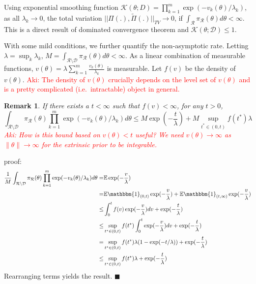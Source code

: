 \documentclass[10pt]{article}
\newcommand{\leo}[1]{{\color{blue}{Leo: #1}}}
\newcommand{\aki}[1]{\textcolor{red}{Aki: #1}}
\newtheorem{remark}{Remark}
\newcommand{\mc}[1]{\mathcal{#1}}
\DeclareMathOperator{\1}{\mathbbm{1}}
\begin{document}
Using exponential smoothing function $\mc K(\theta; D) = \prod_{k=1}^m \exp( -v_k(\theta)/\lambda_k)$, as all $\lambda_k \rightarrow 0$, the total variation $||\Pi(.), \tilde{\Pi}(.) ||_{TV} \rightarrow 0$, if $\int_{\mc R} \pi_{\mc R}(\theta) d\theta<\infty$. This is a direct result of dominated convergence theorem and $\mc K(\theta; \mc D)\le 1$.


With some mild conditions, we further quantify the non-asymptotic rate. Letting $\lambda = \sup_k \lambda_k$, $M= \int_{\mc R \setminus \mc D} \pi_{\mc R}(\theta) d\theta<\infty$. As a linear combination of measurable functions, $v(\theta)=\lambda\sum_{k=1}^m\frac{ v_k(\theta)}{\lambda_k}$ is measurable. Let $f(v)$ be the density of $v(\theta)$. \aki{The density of $v(\theta)$ crucially depends on the level set of $v(\theta)$ and is a pretty complicated (i.e.\ intractable) object in general.}

\begin{remark}
\label{convergence_rate}
If there exists a $t<\infty$ such that $f(v) < \infty$, for any $t>0$,
$$\int_{\mc R \setminus \mc D} {\pi_{\mc R}(\theta)} \prod_{k=1}^m \exp( -v_k(\theta)/\lambda_k) d \theta \le 
 {M} \exp(-\frac{t}{\lambda}) + {M} \sup_{t^*\in(0,t)} {f(t^*)}\lambda 
$$
\aki{How is this bound based on $v(\theta) < t$ useful? We need $v(\theta) \to \infty$ as $\| \theta \| \to \infty$ for the extrinsic prior to be integrable. }\leo{I rephrased the statement}
\end{remark}
proof:
\begin{equation}
\begin{aligned}
\frac{1}{M}\int_{\mc R \setminus \mc D} {\pi_{\mc R}(\theta)} \prod_{k=1}^m \exp( -v_k(\theta)/\lambda_k) d \theta = & 
\mathbb{E} \exp(- \frac{v}{\lambda}) \\
= & \mathbb{E} \mathbbm{1}_{(0,t)} \exp(- \frac{v}{\lambda}) +  \mathbb{E} \mathbbm{1}_{(t,\infty)} \exp(- \frac{v}{\lambda}) \\
\le & \int_0^t f(v) \exp(- \frac{v}{\lambda}) dv + \exp(-\frac{t}{\lambda}) \\
\le & \sup_{t^*\in(0,t)} f(t^*) \int_0^t \exp(- \frac{v}{\lambda}) dv + \exp(-\frac{t}{\lambda}) \\
= & \sup_{t^*\in(0,t)} f(t^*)  \lambda (1- \exp(-t/\lambda)) + \exp(-\frac{t}{\lambda}) \\
\le  & \sup_{t^*\in(0,t)} f(t^*)  \lambda  + \exp(-\frac{t}{\lambda}) \\
\end{aligned}
\end{equation}
Rearranging terms yields the result.  $\blacksquare$
\end{document}
